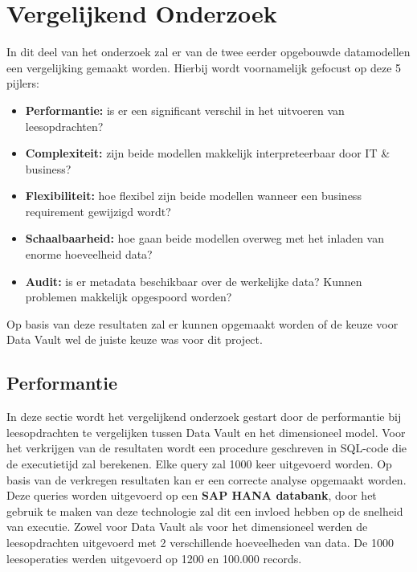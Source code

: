 
\chapter{Vergelijkend Onderzoek}
\label{ch:vergelijkendonderzoek}
In dit deel van het onderzoek zal er van de twee eerder opgebouwde datamodellen een vergelijking gemaakt worden. Hierbij wordt voornamelijk gefocust op deze 5 pijlers:

\begin{itemize}
	\item \textbf{Performantie:} is er een significant verschil in het uitvoeren van leesopdrachten?
	\item \textbf{Complexiteit:} zijn beide modellen makkelijk interpreteerbaar door IT \& business?
	\item \textbf{Flexibiliteit:} hoe flexibel zijn beide modellen wanneer een business requirement gewijzigd wordt?
	\item \textbf{Schaalbaarheid:} hoe gaan beide modellen overweg met het inladen van enorme hoeveelheid data?
	\item \textbf{Audit:} is er metadata beschikbaar over de werkelijke data? Kunnen problemen makkelijk opgespoord worden?
\end{itemize} 

Op basis van deze resultaten zal er kunnen opgemaakt worden of de keuze voor Data Vault wel de juiste keuze was voor dit project.

\section{Performantie}
In deze sectie wordt het vergelijkend onderzoek gestart door de performantie bij leesopdrachten te vergelijken tussen Data Vault en het dimensioneel model. Voor het verkrijgen van de resultaten wordt een procedure geschreven in SQL-code die de executietijd zal berekenen. Elke query zal 1000 keer uitgevoerd worden. Op basis van de verkregen resultaten kan er een correcte analyse opgemaakt worden. Deze queries worden uitgevoerd op een \textbf{SAP HANA databank}, door het gebruik te maken van deze technologie zal dit een invloed hebben op de snelheid van executie. Zowel voor Data Vault als voor het dimensioneel werden de leesopdrachten uitgevoerd met 2 verschillende hoeveelheden van data. De 1000 leesoperaties werden uitgevoerd op 1200 en 100.000 records.

